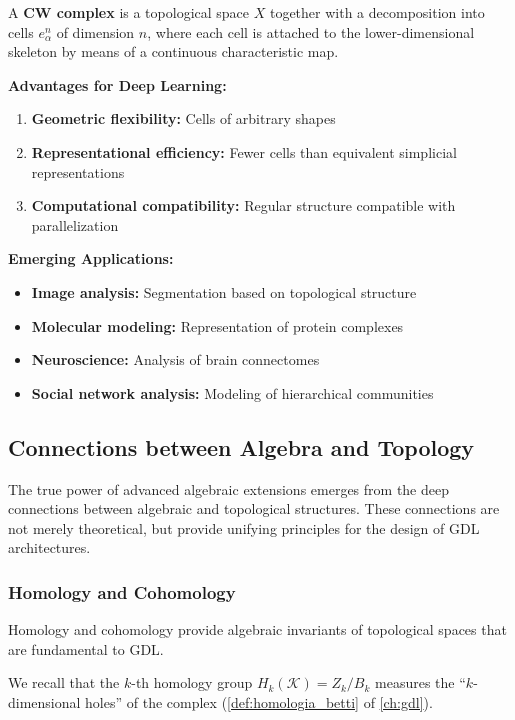 \begin{definition}[CW Complex]
A \textbf{CW complex} is a topological space $X$ together with a decomposition into cells $e^n_\alpha$ of dimension $n$, where each cell is attached to the lower-dimensional skeleton by means of a continuous characteristic map.
\end{definition}

\textbf{Advantages for Deep Learning:}
\begin{enumerate}
    \item \textbf{Geometric flexibility:} Cells of arbitrary shapes
    \item \textbf{Representational efficiency:} Fewer cells than equivalent simplicial representations
    \item \textbf{Computational compatibility:} Regular structure compatible with parallelization
\end{enumerate}

\textbf{Emerging Applications:}
\begin{itemize}
    \item \textbf{Image analysis:} Segmentation based on topological structure
    \item \textbf{Molecular modeling:} Representation of protein complexes
    \item \textbf{Neuroscience:} Analysis of brain connectomes
    \item \textbf{Social network analysis:} Modeling of hierarchical communities
\end{itemize}

\subsection{Connections between Algebra and Topology}

The true power of advanced algebraic extensions emerges from the deep connections between algebraic and topological structures. These connections are not merely theoretical, but provide unifying principles for the design of \gls{GDL} architectures.

\subsubsection{Homology and Cohomology}

Homology and cohomology provide algebraic invariants of topological spaces that are fundamental to \gls{GDL}.

We recall that the $k$-th homology group $H_k(\mathcal{K}) = Z_k / B_k$ measures the ``$k$-dimensional holes'' of the complex (\autoref{def:homologia_betti} of \autoref{ch:gdl}).\label{def:grupos_homologia_cnn}

